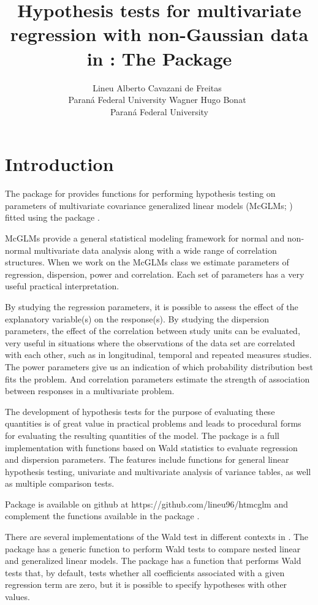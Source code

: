 \documentclass[article]{jss}\usepackage[]{graphicx}\usepackage[]{xcolor}
\author{Lineu Alberto Cavazani de Freitas~\orcidlink{0000-0002-0076-6642}\\Paraná Federal University
   \And Wagner Hugo Bonat~\orcidlink{0000-0002-0349-7054}\\Paraná Federal University}
\title{Hypothesis tests for multivariate regression with non-Gaussian data in \proglang{R}: The \pkg{htmcglm} Package}
\begin{document}

\section{Introduction} \label{sec:intro}

The  package for  \citep{R2022} provides functions for performing hypothesis testing on parameters of multivariate covariance generalized linear models (McGLMs; \citet{Bonat16}) fitted using the  package \citep{mcglm}. 

McGLMs provide a general statistical modeling framework for normal and non-normal multivariate data analysis along with a wide range of correlation structures. When we work on the McGLMs class we estimate parameters of regression, dispersion, power and correlation. Each set of parameters has a very useful practical interpretation.

By studying the regression parameters, it is possible to assess the effect of the explanatory variable(s) on the response(s). By studying the dispersion parameters, the effect of the correlation between study units can be evaluated, very useful in situations where the observations of the data set are correlated with each other, such as in longitudinal, temporal and repeated measures studies. The power parameters give us an indication of which probability distribution best fits the problem. And correlation parameters estimate the strength of association between responses in a multivariate problem.

The development of hypothesis tests for the purpose of evaluating these quantities is of great value in practical problems and leads to procedural forms for evaluating the resulting quantities of the model. The  package is a full  implementation with functions based on Wald statistics to evaluate regression and dispersion parameters. The features include functions for general linear hypothesis testing, univariate and multivariate analysis of variance tables, as well as multiple comparison tests.

Package  is available on github at https://github.com/lineu96/htmcglm and complement the functions available in the package .

There are several implementations of the Wald test in different contexts in . The package  \citep{lmtest} has a generic function to perform Wald tests to compare nested linear and generalized linear models. The package  \citep{survey1,survey2,survey3} has a function that performs Wald tests that, by default, tests whether all coefficients associated with a given regression term are zero, but it is possible to specify hypotheses with other values.
\end{document}
